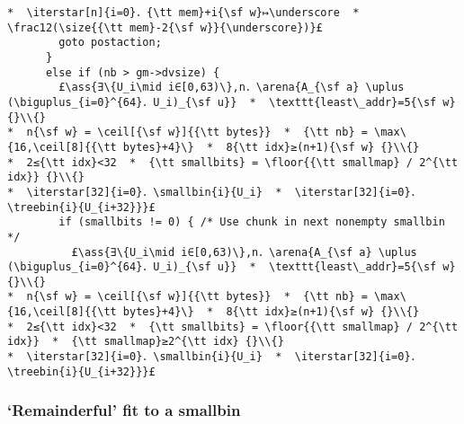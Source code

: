 \documentclass[10pt,a4paper,twoside]{report}
\makeatletter
\newcommand{\ml}[2][t]{\mbox{\mdseries\begin{tabular}[#1]{@{}L@{}}#2\end{tabular}}}
\newcommand{\ass}[1]{\ensuremath{{\color{blue}\left\{\ml[c]{#1}\right\}}}}
\renewcommand{\floor}[2][]{\left\lfloor{#2}\right\rfloor_{#1}}
\renewcommand{\ceil}[2][]{\left\lceil{#2}\right\rceil_{#1}}
\newcommand{\iterstar}[2][]{\text{\LARGE $*$}^{#1}_{#2}}
\makeatother
\begin{document}
\begin{lstlisting}
*  \iterstar[n]{i=0}．{\tt mem}+i{\sf w}↦\underscore  *  \frac12(\size{{\tt mem}-2{\sf w}}{\underscore})}£
        goto postaction;
      }
      else if (nb > gm->dvsize) {
        £\ass{∃\{U_i\mid i∈[0,63)\},n．\arena{A_{\sf a} \uplus (\biguplus_{i=0}^{64}．U_i)_{\sf u}}  *  \texttt{least\_addr}=5{\sf w} {}\\{}
*  n{\sf w} = \ceil[{\sf w}]{{\tt bytes}}  *  {\tt nb} = \max\{16,\ceil[8]{{\tt bytes}+4}\}  *  8{\tt idx}≥(n+1){\sf w} {}\\{}
*  2≤{\tt idx}<32  *  {\tt smallbits} = \floor{{\tt smallmap} / 2^{\tt idx}} {}\\{}
*  \iterstar[32]{i=0}．\smallbin{i}{U_i}  *  \iterstar[32]{i=0}．\treebin{i}{U_{i+32}}}£
        if (smallbits != 0) { /* Use chunk in next nonempty smallbin */
          £\ass{∃\{U_i\mid i∈[0,63)\},n．\arena{A_{\sf a} \uplus (\biguplus_{i=0}^{64}．U_i)_{\sf u}}  *  \texttt{least\_addr}=5{\sf w} {}\\{}
*  n{\sf w} = \ceil[{\sf w}]{{\tt bytes}}  *  {\tt nb} = \max\{16,\ceil[8]{{\tt bytes}+4}\}  *  8{\tt idx}≥(n+1){\sf w} {}\\{}
*  2≤{\tt idx}<32  *  {\tt smallbits} = \floor{{\tt smallmap} / 2^{\tt idx}}  *  {\tt smallmap}≥2^{\tt idx} {}\\{}
*  \iterstar[32]{i=0}．\smallbin{i}{U_i}  *  \iterstar[32]{i=0}．\treebin{i}{U_{i+32}}}£
\end{lstlisting}

\subsubsection*{`Remainderful' fit to a smallbin}\label{sect:remainderful_fit_to_a_smallbin}
\end{document}
